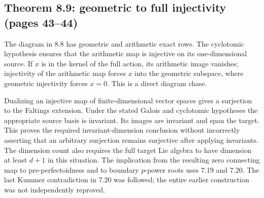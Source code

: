 \documentclass[10pt]{article}
\begin{document}
\subsection*{Theorem 8.9: geometric to full injectivity (pages 43–44)}
The diagram in 8.8 has geometric and arithmetic exact rows. The cyclotomic hypothesis ensures that the arithmetic map is injective on its one-dimensional source. If \(x\) is in the kernel of the full action, its arithmetic image vanishes; injectivity of the arithmetic map forces \(x\) into the geometric subspace, where geometric injectivity forces \(x=0\). This is a direct diagram chase.\par
Dualizing an injective map of finite-dimensional vector spaces gives a surjection to the Faltings extension. Under the stated Galois and cyclotomic hypotheses the appropriate source basis is invariant. Its images are invariant and span the target. This proves the required invariant-dimension conclusion without incorrectly asserting that an arbitrary surjection remains surjective after applying invariants. The dimension count also requires the full target Lie algebra to have dimension at least \(d+1\) in this situation. The implication from the resulting zero connecting map to pre-perfectoidness and to boundary \(p\)-power roots uses 7.19 and 7.20. The last Kummer contradiction in 7.20 was followed; the entire earlier construction was not independently reproved.\par
\end{document}
